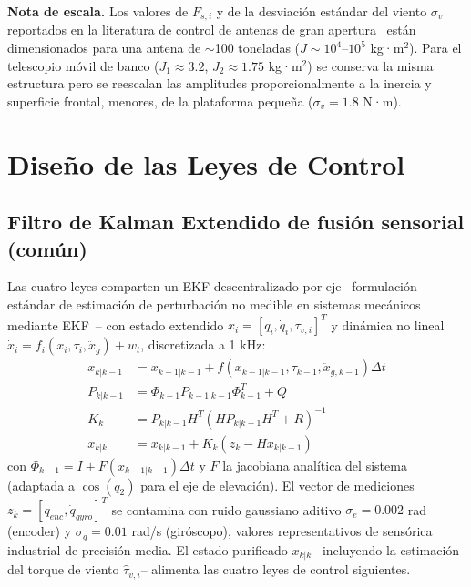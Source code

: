 \documentclass[journal]{IEEEtran}
\begin{document}
\textbf{Nota de escala.} Los valores de $F_{s,i}$ y de la desviación
estándar del viento $\sigma_v$ reportados en la literatura de control de
antenas de gran apertura~\cite{gawronski2008modeling,qiu2014practical}
están dimensionados para una antena de $\sim$100 toneladas
($J\sim10^4$--$10^5$ kg·m$^2$). Para el
telescopio móvil de banco ($J_1\approx3.2$, $J_2\approx1.75$ kg·m$^2$) se
conserva la misma estructura pero se reescalan las amplitudes
proporcionalmente a la inercia y superficie frontal, menores, de la
plataforma pequeña ($\sigma_v = 1.8$ N·m).

\section{Diseño de las Leyes de Control}

\subsection{Filtro de Kalman Extendido de fusión sensorial (común)}
\label{sec:ekf}
Las cuatro leyes comparten un EKF descentralizado por eje --formulación
estándar de estimación de perturbación no medible en sistemas mecánicos
mediante EKF~\cite{agarwal2016disturbance}-- con estado extendido
$x_i = [q_i, \dot q_i, \tau_{v,i}]^T$ y dinámica no lineal
$\dot x_i = f_i(x_i,\tau_i,\ddot x_g) + w_t$, discretizada a 1 kHz:
\begin{align}
x_{k|k-1} &= x_{k-1|k-1} + f(x_{k-1|k-1},\tau_{k-1},\ddot x_{g,k-1})\Delta t\\
P_{k|k-1} &= \Phi_{k-1}P_{k-1|k-1}\Phi_{k-1}^T + Q\\
K_k &= P_{k|k-1}H^T(HP_{k|k-1}H^T+R)^{-1}\\
x_{k|k} &= x_{k|k-1} + K_k(z_k - Hx_{k|k-1})
\end{align}
con $\Phi_{k-1}=I+F(x_{k-1|k-1})\Delta t$ y $F$ la jacobiana analítica del
sistema (adaptada a $\cos(q_2)$ para el eje de elevación). El vector de
mediciones $z_k=[q_{enc},\dot q_{gyro}]^T$ se contamina con ruido
gaussiano aditivo $\sigma_e=0.002$ rad (encoder) y $\sigma_g=0.01$ rad/s
(giróscopo), valores representativos de sensórica industrial de
precisión media. El estado purificado $x_{k|k}$ --incluyendo la
estimación del torque de viento $\hat\tau_{v,i}$-- alimenta las cuatro
leyes de control siguientes.
\end{document}

